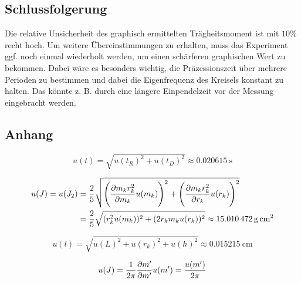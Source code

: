 \subsection{Schlussfolgerung}

Die relative Unsicherheit des graphisch ermittelten Trägheitsmoment ist mit $10\%$ recht hoch.
Um weitere Übereinstimmungen zu erhalten, muss das Experiment ggf. noch einmal wiederholt werden, um einen schärferen graphischen Wert zu bekommen.
Dabei wäre es besonders wichtig, die Präzessionszeit über mehrere Perioden zu bestimmen und dabei die Eigenfrequenz des Kreisels konstant zu halten.
Das könnte z. B. durch eine längere Einpendelzeit vor der Messung eingebracht werden.

\subsection{Anhang}

\begin{equation}
	\label{eq:unc_t}
	u(t) = \sqrt{u(t_R)^2 + u(t_D)^2} \approx \SI{0,020615}{\second}
\end{equation}

\begin{align}
	\label{eq:unc_traeg}
	u(J) = u(J_2) &= \frac{2}{5} \sqrt{\left( \pdv{m_k r_k^2}{m_k} u(m_k)\right) ^2 + \left( \pdv{m_k r_k^2}{r_k} u(r_k)\right) ^2}\\
	&= \frac{2}{5} \sqrt{(r_k^2 u(m_k))^2 + (2r_k m_k u(r_k))^2} \approx \SI{15,010472}{g\,\centi\meter\squared}
\end{align}

\begin{equation}
	\label{eq:unc_length}
	u(l) = \sqrt{u(L)^2 + u(r_k)^2 + u(h)^2} \approx \SI{0,015215}{\centi\meter}
\end{equation}

\begin{equation}
	\label{eq:unc_traeg2}
	u(J) = \frac{1}{2\pi} \pdv{m'}{m'} u(m') = \frac{u(m')}{2\pi}
\end{equation}
